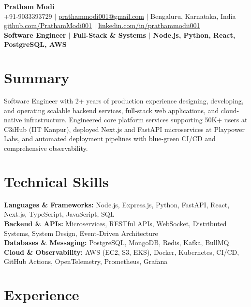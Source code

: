 \documentclass[10pt]{article}
\begin{document}
\begin{center}
{\Huge \textbf{Pratham Modi}} \\[2pt]
+91-9033393729 $\vert$ \href{mailto:prathammodi001@gmail.com}{prathammodi001@gmail.com} $\vert$ Bengaluru, Karnataka, India \\[1pt]
\href{https://github.com/PrathamModi001}{github.com/PrathamModi001} $\vert$ \href{https://www.linkedin.com/in/prathammodii001/}{linkedin.com/in/prathammodii001} \\[2pt]
\textbf{Software Engineer $\vert$ Full-Stack \& Systems $\vert$ Node.js, Python, React, PostgreSQL, AWS}

\end{center}

\vspace{-6pt}
\section{Summary}
Software Engineer with 2+ years of production experience designing, developing, and operating scalable backend services, full-stack web applications, and cloud-native infrastructure. Engineered core platform services supporting 50K+ users at C3iHub (IIT Kanpur), deployed Next.js and FastAPI microservices at Playpower Labs, and automated deployment pipelines with blue-green CI/CD and comprehensive observability.

\section{Technical Skills}
\textbf{Languages \& Frameworks:} Node.js, Express.js, Python, FastAPI, React, Next.js, TypeScript, JavaScript, SQL \\
\textbf{Backend \& APIs:} Microservices, RESTful APIs, WebSocket, Distributed Systems, System Design, Event-Driven Architecture \\
\textbf{Databases \& Messaging:} PostgreSQL, MongoDB, Redis, Kafka, BullMQ \\
\textbf{Cloud \& Observability:} AWS (EC2, S3, EKS), Docker, Kubernetes, CI/CD, GitHub Actions, OpenTelemetry, Prometheus, Grafana \\

\section{Experience}
\end{document}
